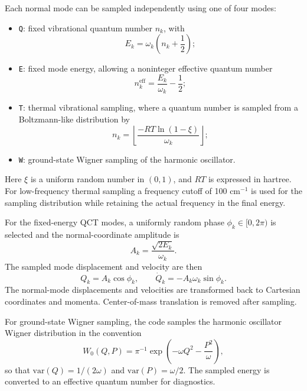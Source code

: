 \documentclass[11pt]{article}
\begin{document}
Each normal mode can be sampled independently using one of four modes:
\begin{itemize}
  \item \texttt{Q}: fixed vibrational quantum number $n_k$, with
  \begin{equation}
    E_k = \omega_k \left(n_k + \frac{1}{2}\right);
  \end{equation}
  \item \texttt{E}: fixed mode energy, allowing a noninteger effective quantum number
  \begin{equation}
    n_k^{\mathrm{eff}} = \frac{E_k}{\omega_k} - \frac{1}{2};
  \end{equation}
  \item \texttt{T}: thermal vibrational sampling, where a quantum number is sampled from a Boltzmann-like distribution by
  \begin{equation}
    n_k = \left\lfloor \frac{-RT\ln(1-\xi)}{\omega_k} \right\rfloor;
  \end{equation}
  \item \texttt{W}: ground-state Wigner sampling of the harmonic oscillator.
\end{itemize}
Here $\xi$ is a uniform random number in $(0,1)$, and $RT$ is expressed in hartree.  For low-frequency thermal sampling a frequency cutoff of 100 cm$^{-1}$ is used for the sampling distribution while retaining the actual frequency in the final energy.

For the fixed-energy QCT modes, a uniformly random phase $\phi_k\in[0,2\pi)$ is selected and the normal-coordinate amplitude is
\begin{equation}
  A_k = \frac{\sqrt{2E_k}}{\omega_k}.
\end{equation}
The sampled mode displacement and velocity are then
\begin{equation}
  Q_k = A_k\cos\phi_k,
  \qquad
  \dot{Q}_k = -A_k\omega_k\sin\phi_k.
\end{equation}
The normal-mode displacements and velocities are transformed back to Cartesian coordinates and momenta.  Center-of-mass translation is removed after sampling.

For ground-state Wigner sampling, the code samples the harmonic oscillator Wigner distribution in the convention
\begin{equation}
  W_0(Q,P)=\pi^{-1}\exp\left(-\omega Q^2-\frac{P^2}{\omega}\right),
\end{equation}
so that $\mathrm{var}(Q)=1/(2\omega)$ and $\mathrm{var}(P)=\omega/2$.  The sampled energy is converted to an effective quantum number for diagnostics.
\end{document}
